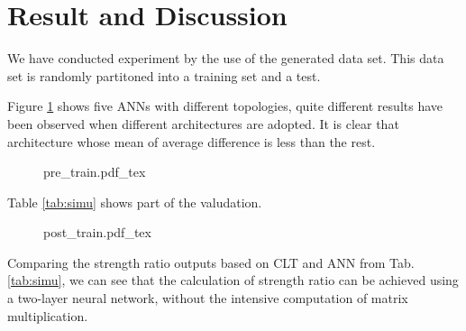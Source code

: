 \section{Result and Discussion}
We have conducted experiment by the use of the generated data set. This data
set is randomly partitoned into a training set and a test.

Figure \ref{fig:train-process} shows five ANNs with different topologies, quite
different results have been observed when different architectures are adopted.
It is clear that architecture whose mean of average difference is less than the
rest.


\begin{figure}
	\centering
	\def\svgwidth{\columnwidth}
	{pre_train.pdf_tex}
	\label{fig:train-process}
\end{figure}

Table \ref{tab:simu} shows part of the valudation.



\begin{figure}
	\centering
	\def\svgwidth{\columnwidth}
	{post_train.pdf_tex}
	\label{fig:final_train}
\end{figure}


Comparing the strength ratio outputs based on CLT and ANN from
Tab.\ref{tab:simu}, we can see that the calculation of strength ratio can be
achieved using a two-layer neural network, without the intensive computation of
matrix multiplication.





